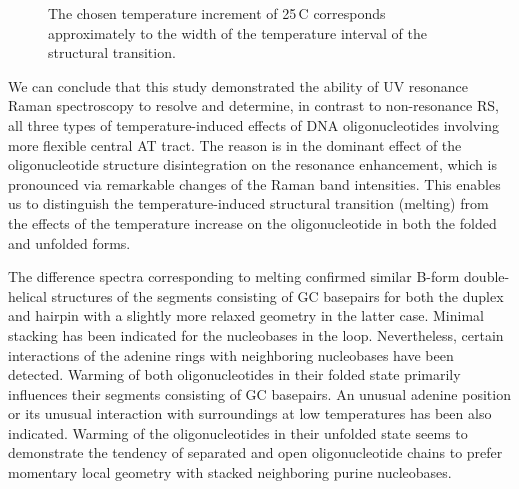 \begin{figure}[t]
	\centering
	\caption[%
		Isolated UV RRS spectra of the folded and unfolded form at several
		temperatures and their differences corresponding to the spectral changes
		caused by the structural transition from the folded to the unfolded form
		(melting) and those caused by a temperature increase when the structural
		form is maintained.
	]{%
		The chosen temperature increment of 25\,\textdegree{}C corresponds
		approximately to the width of the temperature interval of the structural
		transition.
	}
	\label{\figlabel{dna_hairpins:forms_spectra}}
\end{figure}

We can conclude that this study demonstrated the ability of UV resonance Raman
spectroscopy to resolve and determine, in contrast to non-resonance RS, all
three types of temperature-induced effects of DNA oligonucleotides involving
more flexible central AT tract.
The reason is in the dominant effect of the oligonucleotide structure
disintegration on the resonance enhancement, which is pronounced via remarkable
changes of the Raman band intensities.
This enables us to distinguish the temperature-induced structural transition
(melting) from the effects of the temperature increase on the oligonucleotide
in both the folded and unfolded forms.

The difference spectra corresponding to melting confirmed similar B-form
double-helical structures of the segments consisting of GC basepairs for both
the duplex and hairpin with a slightly more relaxed geometry in the latter
case.
Minimal stacking has been indicated for the nucleobases in the loop.
Nevertheless, certain interactions of the adenine rings with neighboring
nucleobases have been detected.
Warming of both oligonucleotides in their folded state primarily influences
their segments consisting of GC basepairs.
An unusual adenine position or its unusual interaction with surroundings at low
temperatures has been also indicated.
Warming of the oligonucleotides in their unfolded state seems to demonstrate
the tendency of separated and open oligonucleotide chains to prefer momentary
local geometry with stacked neighboring purine nucleobases.
